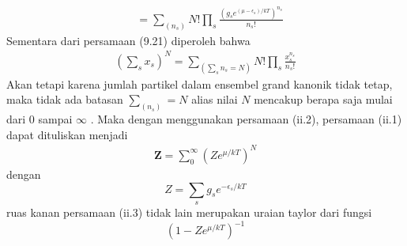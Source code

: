 \documentclass[a4paper , 12 pt]{article}
\begin{document}
\begin{enumerate}
\begin{description}
\begin{align}
	& = \sum_{(n_s)} N ! \prod_s  \frac{(g_s e^{(\mu - \epsilon_s)/kT})^{n_s}}{n_s !} \tag{ii.1}
	\end{align}
	Sementara dari persamaan (9.21) diperoleh bahwa 
	\begin{align}
	\left(\sum_s x_s \right)^N = \sum_{\left ( \sum_s n_s = N\right )}  N ! \prod_s \frac{x_s^{n_s}}{n_s !} \tag{ii.2}
	\end{align}
	Akan tetapi  karena jumlah partikel dalam ensembel grand kanonik tidak tetap, maka tidak ada batasan $\displaystyle \sum_{(n_s)} = N$ alias nilai $N$ mencakup berapa saja mulai dari $0$ sampai $\infty$ . Maka dengan menggunakan persamaan (ii.2), persamaan (ii.1) dapat dituliskan menjadi 
	\begin{align}
	\boldsymbol{Z} = \sum_0^\infty (Z e^{\mu /kT })^N \tag{ii.3}
	\end{align}
	dengan 
	\[
	Z = \sum_s g_s e^{-\epsilon_s / kT} \tag{ii.4}
	\]
	\newline
	ruas kanan persamaan (ii.3) tidak lain merupakan uraian taylor dari fungsi 
	\[
	(1 - Z e^{\mu /kT})^{-1} \tag{QED}
	\]
	

\end{description}
\end{enumerate}
\end{document}
